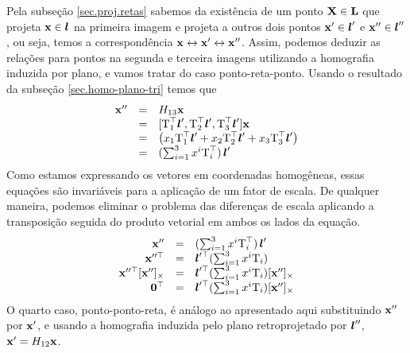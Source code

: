 Pela subseção \ref{sec.proj.retas} sabemos da existência de um ponto $\mathbf{X}\in{\bf L}$ que projeta $\mathbf{x}\in\boldsymbol{l}$ na primeira imagem e projeta a outros dois pontos $\mathbf{x}'\in\boldsymbol{l}'$ e $\mathbf{x}''\in\boldsymbol{l}''$, ou seja, temos a correspondência $\mathbf{x}\leftrightarrow\mathbf{x}'\leftrightarrow\mathbf{x}''$. Assim, podemos deduzir as relações para 
pontos na segunda e terceira imagens utilizando a homografia induzida por plano, e vamos tratar do caso ponto-reta-ponto. Usando o resultado da subseção \ref{sec.homo-plano-tri} temos que 
\begin{equation*}
\begin{array}{rcl}
\mathbf{x}''&=&H_{13}\mathbf{x}\\
&=&[\mbox{T}_1^\top\boldsymbol{l}',\mbox{T}_2^\top\boldsymbol{l}',\mbox{T}_3^\top\boldsymbol{l}']\mathbf{x}\\
&=&
\begin{pmatrix}
x_1\mbox{T}_1^\top\boldsymbol{l}'+x_2\mbox{T}_2^\top\boldsymbol{l}'+x_3\mbox{T}_3^\top\boldsymbol{l}'
\end{pmatrix}\\
&=&(\sum_{i=1}^3 x^i\mbox{T}_i^\top)\,\boldsymbol{l}'
\end{array}
\end{equation*}
Como estamos expressando os vetores em coordenadas homogêneas, essas equações são invariáveis para a aplicação de um fator de escala. De qualquer maneira, podemos eliminar o problema das diferenças de escala aplicando a transposição seguida do produto vetorial em ambos os lados da equação.
\begin{equation}\label{eq.ponto-reta-ponto}
\begin{array}{rcl}
\mathbf{x}''&=&(\sum_{i=1}^3 x^i\mbox{T}_i^\top)\,\boldsymbol{l}'\\
\mathbf{x}''^\top&=&\boldsymbol{l}'^\top(\sum_{i=1}^3 x^i\mbox{T}_i)\\
\mathbf{x}''^\top[\mathbf{x}'']_\times&=&\boldsymbol{l}'^\top(\sum_{i=1}^3 x^i\mbox{T}_i)[\mathbf{x}'']_\times\\
{\bf 0}^\top&=&\boldsymbol{l}'^\top(\sum_{i=1}^3 x^i\mbox{T}_i)[\mathbf{x}'']_\times
\end{array}
\end{equation}
O quarto caso, ponto-ponto-reta, é análogo ao apresentado aqui substituindo $\mathbf{x}''$ por $\mathbf{x}'$, e usando a homografia induzida pelo plano retroprojetado por $\boldsymbol{l}''$, $\mathbf{x}'=H_{12}\mathbf{x}$.

